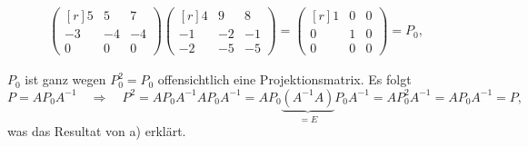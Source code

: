 \begin{loesung}
\begin{teilaufgaben}
\begin{align*}
\begin{pmatrix*}[r]
 5& 5& 7\\
-3&-4&-4\\
 0& 0& 0
\end{pmatrix*}
\begin{pmatrix*}[r]
 4& 9& 8\\
-1&-2&-1\\
-2&-5&-5
\end{pmatrix*}
=
\begin{pmatrix*}[r]
1&0&0\\
0&1&0\\
0&0&0
\end{pmatrix*}
=P_0,
\end{align*}
\item
$P_0$ ist ganz wegen
$P_0^2=P_0$
offensichtlich eine Projektionsmatrix.
Es folgt
\[
P=AP_0A^{-1}
\quad\Rightarrow\quad
P^2
=
AP_0A^{-1} AP_0A^{-1}
=
AP_0\underbrace{(A^{-1} A)}_{\displaystyle =E}P_0A^{-1}
=
AP_0^2A^{-1}
=
AP_0A^{-1}
=
P,
\]
was das Resultat von a) erklärt.
\qedhere
\end{teilaufgaben}
\end{loesung}

